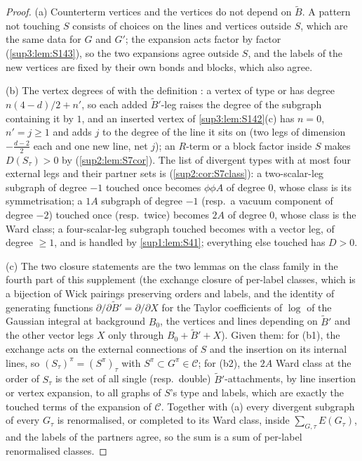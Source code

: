 \begin{proof}
(a) Counterterm vertices \cite[(1.26)--(1.31)]{Ba3} and the vertices \cite[(1.6), (1.7), (1.10), (1.11)]{Ba3} do not depend on $\tilde B$. A pattern not touching $S$ consists of choices on the lines and vertices outside $S$, which are the same data for $G$ and $G'$; the expansion acts factor by factor (\cref{sup3:lem:S143}), so the two expansions agree outside $S$, and the labels of the new vertices are fixed by their own bonds and blocks, which also agree.

(b) The vertex degrees of \cite[p.~423]{Ba3} with the definition \cite[(2.2)]{Ba3}: a vertex of type \cite[(1.8)]{Ba3} or \cite[(1.10)]{Ba3} has degree $n(4-d)/2+n'$, so each added $\tilde B'$-leg raises the degree of the subgraph containing it by $1$, and an inserted vertex of \cref{sup3:lem:S142}(c) has $n=0$, $n'=j\ge1$ and adds $j$ to the degree of the line it sits on (two legs of dimension $-\frac{d-2}2$ each and one new line, net $j$); an $R$-term or a block factor inside $S$ makes $D(S_\tau)>0$ by \cite[Cor.~2.3]{Ba3} (\cref{sup2:lem:S7cor}). The list of divergent types with at most four external legs and their partner sets is \cite[pp.~429--431]{Ba3} (\cref{sup2:cor:S7class}): a two-scalar-leg subgraph of degree $-1$ touched once becomes $\phi\phi A$ of degree $0$, whose class is its symmetrisation; a $1A$ subgraph of degree $-1$ (resp.\ a vacuum component of degree $-2$) touched once (resp.\ twice) becomes $2A$ of degree $0$, whose class is the Ward class; a four-scalar-leg subgraph touched becomes \cite[(2.4)]{Ba3} with a vector leg, of degree $\ge1$, and is handled by \cref{sup1:lem:S41}; everything else touched has $D>0$.

(c) The two closure statements are the two lemmas on the class family in the fourth part of this supplement (the exchange closure of per-label classes, which is a bijection of Wick pairings preserving orders and labels, and the identity of generating functions $\partial/\partial\tilde B'=\partial/\partial X$ for the Taylor coefficients of $\log$ of the Gaussian integral at background $B_0$, the vertices and lines depending on $\tilde B'$ and the other vector legs $X$ only through $B_0+\tilde B'+X$). Given them: for (b1), the exchange acts on the external connections of $S$ and the insertion on its internal lines, so $(S_\tau)^\pi=(S^\pi)_\tau$ with $S^\pi\subset G^\pi\in\mathcal C$; for (b2), the $2A$ Ward class at the order of $S_\tau$ is the set of all single (resp.\ double) $\tilde B'$-attachments, by line insertion or vertex expansion, to all graphs of $S$'s type and labels, which are exactly the touched terms of the expansion of $\mathcal C$. Together with (a) every divergent subgraph of every $G_\tau$ is renormalised, or completed to its Ward class, inside $\sum_{G,\tau}E(G_\tau)$, and the labels of the partners agree, so the sum is a sum of per-label renormalised classes.
\end{proof}

